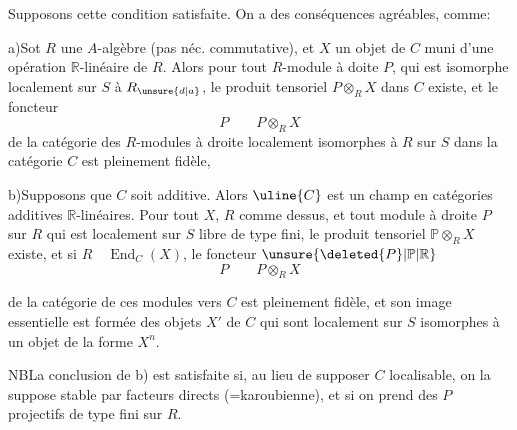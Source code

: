 Supposons cette condition satisfaite. On a des conséquences agréables, comme:

a)\quad Sot  $R$ une $A$-algèbre (pas néc. commutative), et $X$ un objet de $C$ muni d'une opération $\mathbb{R}$-linéaire de $R$. Alors pour tout $R$-module à doite $P$, qui est isomorphe localement sur $S$ à $R_{\unsure{d|a}}$, le produit tensoriel $P\otimes_R X$ dans $C$ existe, et  le foncteur
\[
P\qquad P\otimes_R X
\]
de la catégorie  des $R$-modules à droite localement isomorphes à $R$ sur $S$ dans la catégorie $C$ est pleinement fidèle, 

b)\quad Supposons que $C$ soit additive. Alors $\uline{C}$ est un champ en catégories additives $\mathbb{R}$-linéaires. Pour tout $X$, $R$ comme dessus,  et tout module à droite $P$ sur $R$ qui est localement sur $S$ libre de type fini, le produit tensoriel $\mathbb{P}\otimes_R X$ existe, et si $R\quad\operatorname{End}_C(X)$, le foncteur $\unsure{\deleted{P}|\mathbb{P}|\mathbb{R}}$
\[
P\qquad P\otimes_R X
\]


de la catégorie de ces modules vers $C$ est pleinement fidèle, et son image essentielle est formée des objets $X'$ de $C$ qui sont localement sur $S$ isomorphes à un objet de la forme $X^n$.

NB\quad La conclusion de b) est satisfaite si, au lieu de supposer $C$ localisable, on la suppose stable par facteurs directs (=karoubienne), et  si on prend des $P$ projectifs de type fini sur $R$.

